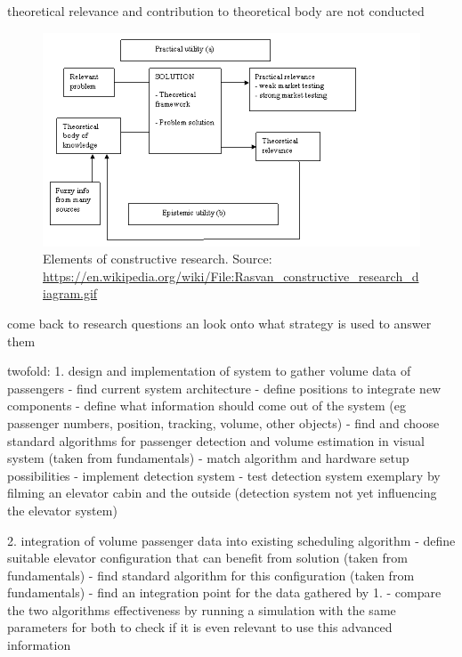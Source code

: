 theoretical relevance and contribution to theoretical body are not conducted

\begin{figure}[hbt]
	\centering
	\includegraphics[width=1.0\textwidth, keepaspectratio]{resources/Rasvan_constructive_research_diagram}
	\caption{\label{fig:design:constructiveresearch} Elements of constructive research. Source:
	\url{https://en.wikipedia.org/wiki/File:Rasvan_constructive_research_diagram.gif}}
\end{figure}


come back to research questions an look onto what strategy is used to answer them

twofold:
1. design and implementation of system to gather volume data of passengers
 - find current system architecture
 - define positions to integrate new components
 - define what information should come out of the system
 (eg passenger numbers, position, tracking, volume, other objects)
 - find and choose standard algorithms for passenger detection and volume estimation in visual system (taken from fundamentals)
 - match algorithm and hardware setup possibilities
 - implement detection system
 - test detection system exemplary by filming an elevator cabin and the outside (detection system not yet influencing the elevator system)
 
2. integration of volume passenger data into existing scheduling algorithm
 - define suitable elevator configuration that can benefit from solution (taken from fundamentals) 
 - find standard algorithm for this configuration (taken from fundamentals)
 - find an integration point for the data gathered by 1.
 - compare the two algorithms effectiveness by running a simulation with the same parameters for both to check if it is even relevant to use this advanced information
 
